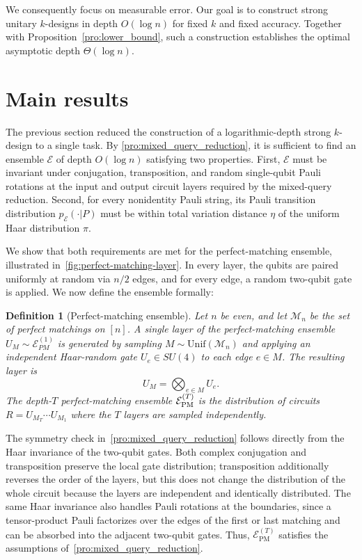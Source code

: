\documentclass[
    aps,
    superscriptaddress,
    onecolumn,
    10pt,
    prx,
    nofootinbib
]{revtex4-2}
\newtheorem{definition}{Definition}
\theoremstyle{namedstatement}
\theoremstyle{plain}
\begin{document}
We consequently focus on measurable error. Our goal is to construct strong unitary $k$-designs in depth $O(\log n)$ for fixed $k$ and fixed accuracy. Together with Proposition~\ref{pro:lower_bound}, such a construction establishes the optimal asymptotic depth $\Theta(\log{n})$.






\section{Main results} \label{sec:Main_results}

The previous section reduced the construction of a logarithmic-depth strong $k$-design to a single task. By \cref{pro:mixed_query_reduction}, it is sufficient to find an ensemble $\mathcal{E}$ of depth $O(\log n)$ satisfying two properties. First, $\mathcal{E}$ must be invariant under conjugation, transposition, and random single-qubit Pauli rotations at the input and output circuit layers required by the mixed-query reduction. Second, for every nonidentity Pauli string, its Pauli transition distribution $p_{\mathcal{E}}(\cdot|P)$ must be within total variation distance $\eta$ of the uniform Haar distribution $\pi$.


We show that both requirements are met for the perfect-matching ensemble, illustrated in~\cref{fig:perfect-matching-layer}. In every layer, the qubits are paired uniformly at random via $n/2$ edges, and for every edge, a random two-qubit gate is applied. We now define the ensemble formally:

\begin{definition}[Perfect-matching ensemble]\label{def:pm-ensemble}
Let $n$ be even, and let $\mathcal{M}_{n}$ be the set of perfect matchings on
$[n]$.  A single layer of the perfect-matching ensemble $U_M\sim\mathcal{E}_{PM}^{(1)}$ is generated by sampling $M\sim\mathrm{Unif}(\mathcal{M}_{n})$ and applying
an independent Haar-random gate $U_{e}\in SU(4)$ to each edge 
$e\in M$. The resulting layer is
\begin{equation}\label{eq:pm-layer}
 U_{M}=\bigotimes_{e\in M}U_{e}.
\end{equation}
The depth-$T$ perfect-matching ensemble $\mathcal{E}_{\rm PM}^{(T)}$ is the distribution of circuits $R=U_{M_T}\cdots U_{M_1}$ where the $T$ layers are sampled independently.
\end{definition}

The symmetry check in~\cref{pro:mixed_query_reduction} follows directly from the Haar invariance of the two-qubit gates. Both complex conjugation and transposition preserve the local gate distribution; transposition additionally reverses the order of the layers, but this does not change the distribution of the whole circuit because the layers are independent and identically distributed. The same Haar invariance also handles Pauli rotations at the boundaries, since a tensor-product Pauli factorizes over the edges of the first or last matching and can be absorbed into the adjacent two-qubit gates. Thus, $\mathcal E_{\mathrm{PM}}^{(T)}$ satisfies the assumptions of~\cref{pro:mixed_query_reduction}.
\end{document}
